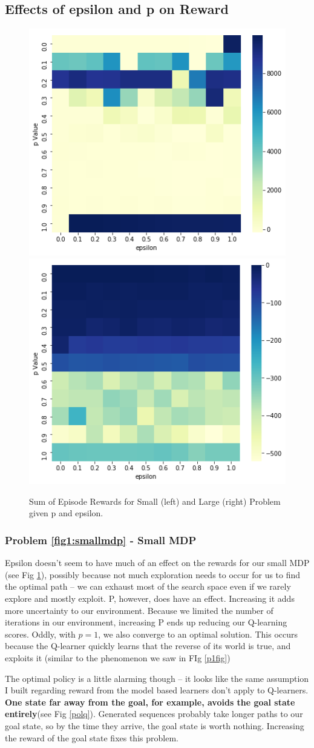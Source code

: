\documentclass[letter]{article}
\begin{document}
\subsection{Effects of epsilon and p on Reward}
\begin{figure}[]
    \centering
    \includegraphics[width=.4\linewidth]{small_ep_p.png}
    \includegraphics[width=.4\linewidth]{large_ep_p.png}
    \caption{Sum of Episode Rewards for Small (left) and Large (right) Problem given p and epsilon.}
    \label{epsilon_p}
\end{figure}
\subsubsection{Problem \ref{fig1:smallmdp} - Small MDP}
Epsilon doesn't seem to have much of an effect on the rewards for our small MDP (see Fig \ref{epsilon_p}), possibly because not much exploration needs to occur for us to find the optimal path -- we can exhaust most of the search space even if we rarely explore and mostly exploit. P, however, does have an effect. Increasing it adds more uncertainty to our environment. Because we limited the number of iterations in our environment, increasing P ends up reducing our Q-learning scores. Oddly, with $p=1$, we also converge to an optimal solution. This occurs because the Q-learner quickly learns that the reverse of its world is true, and exploits it (similar to the phenomenon we saw in FIg \ref{p1fig})

The optimal policy is a little alarming though -- it looks like the same assumption I built regarding reward from the model based learners don't apply to Q-learners. \textbf{One state far away from the goal, for example, avoids the goal state entirely}(see Fig \ref{polq}). Generated sequences probably take longer paths to our goal state, so by the time they arrive, the goal state is worth nothing. Increasing the reward of the goal state fixes this problem. 
\end{document}
